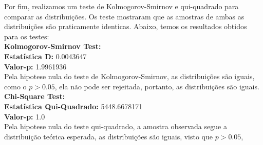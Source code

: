 \documentclass[a4paper, 12pt]{article}
\begin{document}
Por fim, realizamos um teste de Kolmogorov-Smirnov e qui-quadrado para comparar as distribuições. 
Os teste mostraram que as amostras de ambas as distribuições são praticamente identicas. Abaixo, temos
os resultados obtidos para os testes:
\\

\noindent\textbf{Kolmogorov-Smirnov Test:}\\
\textbf{Estatística D: }0.0043647\\
\textbf{Valor-p: }1.9961936
\\

Pela hipotese nula do teste de Kolmogorov-Smirnov, as distribuições são iguais, como o \(p> 0.05\),
ela não pode ser rejeitada, portanto, as distribuições são iguais.
\\

\noindent\textbf{Chi-Square Test:}\\
\textbf{Estatística Qui-Quadrado: }5448.6678171\\
\textbf{Valor-p: }1.0
\\

Pela hipotese nula do teste qui-quadrado, a amostra observada segue a distribuição teórica esperada, 
as distribuições são iguais, visto que \(p> 0.05\),
\end{document}
